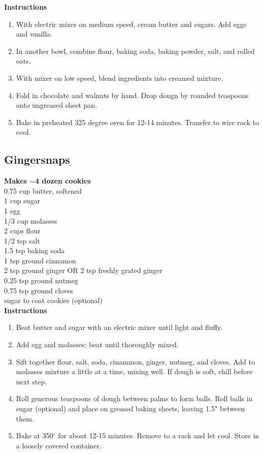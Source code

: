 \documentclass{article}
\numberwithin{figure}{section}
\numberwithin{equation}{section}
\begin{document}
{\bf Instructions}
\begin{enumerate}
\item With electric mixer on medium speed, cream butter and sugars. Add eggs and vanilla.
\item In another bowl, combine flour, baking soda, baking powder, salt, and rolled oats.
\item With mixer on low speed, blend ingredients into creamed mixture.
\item Fold in chocolate and walnuts by hand. Drop dougn by rounded teaspoons onto ungreased sheet pan.
\item Bake in preheated 325 degree oven for 12-14 minutes. Transfer to wire rack to cool.
\end{enumerate}

\pagebreak
\subsection{Gingersnaps}
{\bf Makes $\sim$4 dozen cookies}\\
0.75 cup butter, softened\\
1 cup sugar\\
1 egg\\
1/3 cup molasses\\
2 cups flour\\
1/2 tsp salt\\
1.5 tsp baking soda\\
1 tsp ground cinnamon\\
2 tsp ground ginger OR 2 tsp freshly grated ginger\\
0.25 tsp ground nutmeg\\
0.75 tsp ground cloves\\
sugar to coat cookies (optional)\\

{\bf Instructions}
\begin{enumerate}
\item Beat butter and sugar with an electric mixer until light and fluffy.
\item Add egg and molasses; beat until thoroughly mixed.\\
\item Sift together flour, salt, soda, cinammon, ginger, nutmeg, and cloves. Add to molasses mixture a little at a time, mixing well. If dough is soft, chill before next step.
\item Roll generous teaspoons of dough between palms to form balls. Roll balls in sugar (optional) and place on greased baking sheets, leaving 1.5" between them.
\item Bake at 350$^\circ$ for about 12-15 minutes. Remove to a rack and let cool. Store in a loosely covered container.
\end{enumerate}
\end{document}
